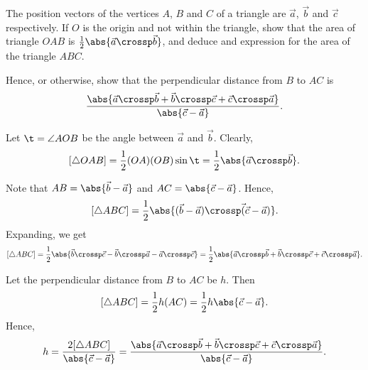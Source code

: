 \begin{problem}
    The position vectors of the vertices $A$, $B$ and $C$ of a triangle are $\vec a$, $\vec b$ and $\vec c$ respectively. If $O$ is the origin and not within the triangle, show that the area of triangle $OAB$ is $\frac12 \abs{\vec a \crossp \vec b}$, and deduce and expression for the area of the triangle $ABC$.

    Hence, or otherwise, show that the perpendicular distance from $B$ to $AC$ is \[\frac{\abs{\vec a \crossp \vec b + \vec b \crossp \vec c + \vec c \crossp \vec a}}{\abs{\vec c - \vec a}}.\]
\end{problem}
\begin{solution}
    Let $\t = \angle AOB$ be the angle between $\vec a$ and $\vec b$. Clearly, \[[\triangle OAB] = \frac12 (OA) (OB) \sin \t = \frac12 \abs{\vec a \crossp \vec b}.\]

    Note that $AB = \abs{\vec b - \vec a}$ and $AC = \abs{\vec c - \vec a}$. Hence, \[[\triangle ABC] = \frac12 \abs{(\vec b - \vec a) \crossp \vec (\vec c - \vec a)}.\] Expanding, we get \[[\triangle ABC] = \frac12 \abs{\vec b \crossp \vec c - \vec b \crossp \vec a - \vec a \crossp \vec c} = \frac12 \abs{\vec a \crossp \vec b + \vec b \crossp \vec c + \vec c \crossp \vec a}.\]

    Let the perpendicular distance from $B$ to $AC$ be $h$. Then \[[\triangle ABC] = \frac12 h (AC) = \frac12 h \abs{\vec c - \vec a}.\] Hence, \[h = \frac{2 [\triangle ABC]}{\abs{\vec c- \vec a}} = \frac{\abs{\vec a \crossp \vec b + \vec b \crossp \vec c + \vec c \crossp \vec a}}{\abs{\vec c - \vec a}}.\]
\end{solution}

